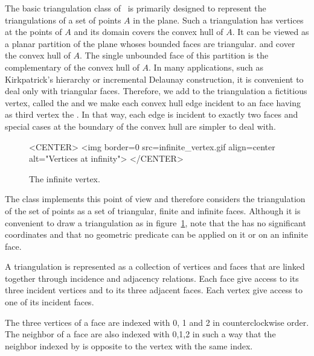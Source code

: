 The basic triangulation class 
 of \cgal\ is primarily designed to represent the  triangulations
 of a set of points ${  A}$ in the plane.
Such a triangulation has vertices at the points of ${  A}$
and its domain covers the convex hull of ${  A}$.
It can be viewed as a planar partition of the plane
whoses bounded faces are triangular. and cover
the convex hull of ${  A}$. The single unbounded face of this partition
is the complementary of the convex hull of ${  A}$. 
In many applications, such as Kirkpatrick's hierarchy
or incremental Delaunay construction, it is convenient to
deal only with triangular faces. Therefore, we add to the
triangulation
a fictitious vertex, called the 
and we make each  convex hull edge incident 
to an  
face having as third vertex  the .
 In that way, each edge is incident to exactly two faces
and special cases at the
boundary of the convex hull are simpler to deal with.



\begin{figure}
\begin{ccTexOnly}
\begin{center}   \end{center}
\end{ccTexOnly}
\caption{The infinite vertex.
\label{I1_Fig_infinite_vertex}}
\begin{ccHtmlOnly}
<CENTER>
<img border=0 src=infinite_vertex.gif align=center alt="Vertices at
infinity">
</CENTER>
\end{ccHtmlOnly}
\end{figure}


The class 
implements this point of view
and therefore considers  the triangulation of the set of points 
as a set of  triangular,  finite and
infinite faces. 
Although it is convenient to draw a triangulation as in
figure~\ref{I1_Fig_infinite_vertex}, note that
the  has no significant
coordinates and that no geometric predicate can be applied on it
or on an infinite face.

A triangulation is represented as a collection of vertices and faces that
are linked together through incidence and adjacency relations.
Each face give access to its three incident vertices and to
its 
three adjacent faces. Each vertex give access to one of its  incident
faces. 

The three vertices of a face are indexed with 0, 1 and 2
in counterclockwise order. The neighbor of a face are also 
indexed with 0,1,2 in such a way that the neighbor indexed by 
is opposite to the vertex with the same index.


